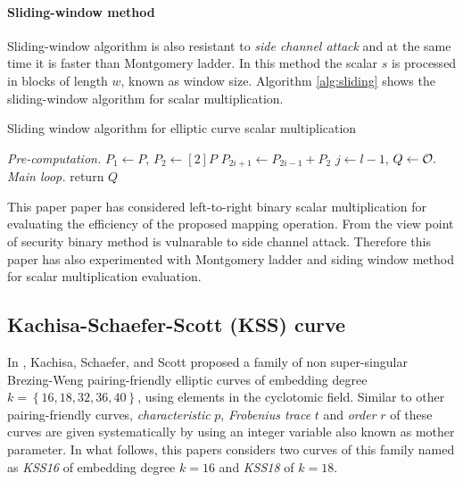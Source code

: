 \paragraph{Sliding-window method}
Sliding-window \cite{ate} algorithm is also resistant to \textit{side channel attack} and at the same  time it is faster than Montgomery ladder. In this method the scalar $s$ is processed in blocks of length $w$, known as window size.  Algorithm \ref{alg:sliding} shows the sliding-window algorithm for scalar multiplication.
 \begin{algorithm}
  \caption{Sliding window algorithm for elliptic curve scalar multiplication}
  \label{alg:sliding}
  \DontPrintSemicolon
  \hspace{-3ex}
   \;
  \hspace{-3ex}
   \;
  \textit{Pre-computation.} \; 
  \nl $P_1\leftarrow P$, $P_2 \leftarrow [2]P$ \;
  \nl {} { $P_{2i+1} \leftarrow P_{2i-1} + P_2$}\;
  \nl $j \leftarrow l-1$, $Q \leftarrow \cal{O}.$\;
  \textit{Main loop.}\;
   \nl {} {\;
    \nl {}
\nl            {}
            }
 \nl return $Q$
\end{algorithm}

This paper paper has considered left-to-right binary scalar multiplication for evaluating the efficiency of the proposed mapping operation. From the view point of security binary method is vulnarable to side channel attack. Therefore this paper has also experimented with Montgomery ladder \cite{Silverman} and siding window method for scalar multiplication evaluation.

\subsection{Kachisa-Schaefer-Scott (KSS) curve \cite{kss}}
 In \cite{kss}, Kachisa, Schaefer, and Scott proposed a family of non super-singular Brezing-Weng pairing-friendly elliptic curves of embedding degree $k = \left\lbrace16, 18, 32, 36, 40\right\rbrace$, using elements in the cyclotomic field. Similar to other pairing-friendly curves,  \textit{characteristic} $p$, \textit{Frobenius trace} $t$ and \textit{order} $r$ of these curves are given systematically by using an integer variable also known as mother parameter. In what follows, this papers considers two curves of this family named as \textit{KSS16} of embedding degree $k =16$  and \textit{KSS18} of $k=18$. 

